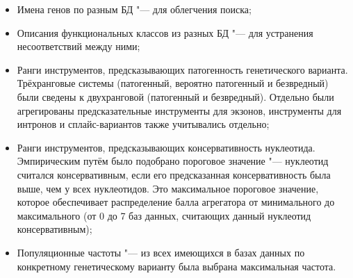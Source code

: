 \documentclass[a4paper,14pt]{extarticle}
\begin{document}
\begin{itemize}
	\item Имена генов по разным БД "--- для облегчения поиска;
	\item Описания функциональных классов из разных БД "--- для устранения несоответствий между ними;
	\item Ранги инструментов, предсказывающих патогенность генетического варианта.
	 Трёхранговые системы (патогенный, вероятно патогенный и безвредный) были сведены к двухранговой (патогенный и безвредный).
	 Отдельно были агрегированы предсказательные инструменты для экзонов, инструменты для интронов и сплайс-вариантов также учитывались отдельно;
	\item Ранги инструментов, предсказывающих консервативность нуклеотида.
	 Эмпирическим путём было подобрано пороговое значение  "--- нуклеотид считался консервативным, если его предсказанная консервативность была выше, чем у  всех нуклеотидов.
	 Это максимальное пороговое значение, которое обеспечивает распределение балла агрегатора от минимального до максимального (от 0 до 7 баз данных, считающих данный нуклеотид консервативным);
	\item Популяционные частоты "--- из всех имеющихся в базах данных по конкретному генетическому варианту была выбрана максимальная частота.
\end{itemize}
\end{document}
